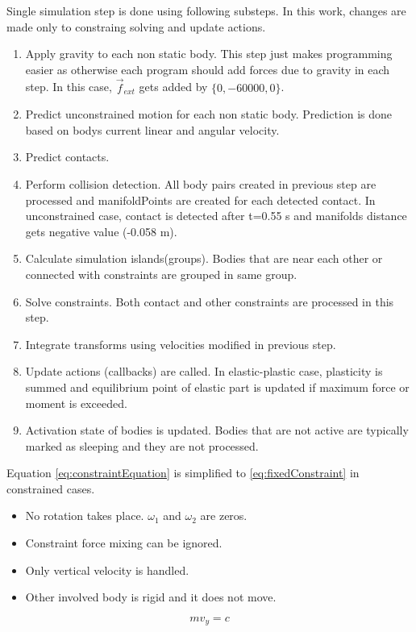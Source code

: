 Single simulation step is done using following substeps. 
In this work, changes are made only to constraing solving and update actions.
\begin{enumerate}
\item Apply gravity to each non static body. 
This step just makes programming easier as otherwise each program should add forces due to gravity in each step. 
In this case, $\vec{f}_{ext}$ gets added by $\lbrace{0,-60000,0}\rbrace$.
\item Predict unconstrained motion for each non static body. Prediction is done based on bodys current linear and angular velocity.
\item Predict contacts.
\item Perform collision detection. All body pairs created in previous step are processed and manifoldPoints are created for
each detected contact. In unconstrained case, contact is detected after t=0.55 s and manifolds distance gets negative value (-0.058 m).
\item Calculate simulation islands(groups). Bodies that are near each other or connected with constraints are grouped in same group.
\item Solve constraints. Both contact and other constraints are processed in this step.
\item Integrate transforms using velocities modified in previous step.
\item Update actions (callbacks) are called. 
In elastic-plastic case, plasticity is summed and equilibrium point of elastic part is updated if maximum force or moment is exceeded.
\item Activation state of bodies is updated. Bodies that are not active
 are typically marked as sleeping and they are not processed.
\end{enumerate} 

Equation \ref{eq:constraintEquation} is simplified
to \ref{eq:fixedConstraint} in constrained cases.
\begin{itemize}
\item No rotation takes place. $\omega_1$ and $\omega_2$ are zeros.
\item Constraint force mixing can be ignored.
\item Only vertical velocity is handled.
\item Other involved body is rigid and it does not move.
\end{itemize} 

\begin{equation} \label{eq:fixedConstraint}
m v_y = c 
\end{equation}

